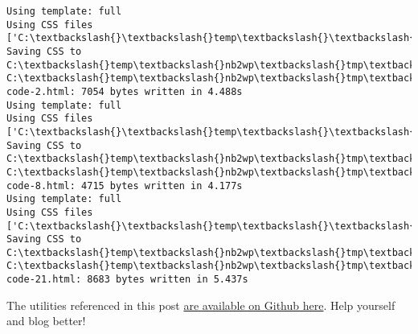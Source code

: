     \begin{Verbatim}[commandchars=\\\{\}]
Using template: full
Using CSS files ['C:\textbackslash{}\textbackslash{}temp\textbackslash{}\textbackslash{}nb2wp\textbackslash{}\textbackslash{}style.css']
Saving CSS to C:\textbackslash{}temp\textbackslash{}nb2wp\textbackslash{}tmp\textbackslash{}style.css
C:\textbackslash{}temp\textbackslash{}nb2wp\textbackslash{}tmp\textbackslash{}UsingJodliterate-code-2.html: 7054 bytes written in 4.488s
Using template: full
Using CSS files ['C:\textbackslash{}\textbackslash{}temp\textbackslash{}\textbackslash{}nb2wp\textbackslash{}\textbackslash{}style.css']
Saving CSS to C:\textbackslash{}temp\textbackslash{}nb2wp\textbackslash{}tmp\textbackslash{}style.css
C:\textbackslash{}temp\textbackslash{}nb2wp\textbackslash{}tmp\textbackslash{}UsingJodliterate-code-8.html: 4715 bytes written in 4.177s
Using template: full
Using CSS files ['C:\textbackslash{}\textbackslash{}temp\textbackslash{}\textbackslash{}nb2wp\textbackslash{}\textbackslash{}style.css']
Saving CSS to C:\textbackslash{}temp\textbackslash{}nb2wp\textbackslash{}tmp\textbackslash{}style.css
C:\textbackslash{}temp\textbackslash{}nb2wp\textbackslash{}tmp\textbackslash{}UsingJodliterate-code-21.html: 8683 bytes written in 5.437s
    \end{Verbatim}

    The utilities referenced in this post
\href{https://github.com/bakerjd99/Analyze-the-Data-not-the-Drivel/tree/master/bluts}{are
available on Github here}. Help yourself and blog better!


    
    
    
%
